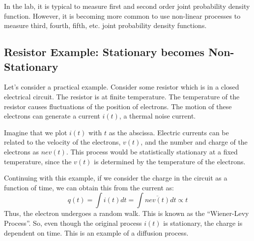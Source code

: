 \documentclass{article}
\begin{document}
In the lab, it is typical to measure first and second order joint probability
density function. However, it is becoming more common to use non-linear
processes to measure third, fourth, fifth, etc. joint probability density
functions.

\subsection{Resistor Example: Stationary becomes Non-Stationary}
Let's consider a practical example. Consider some resistor which is in a closed
electrical circuit. The resistor is at finite temperature. The temperature of
the resistor causes fluctuations of the position of electrons. The motion of
these electrons can generate a current $ i(t) $, a thermal noise current.

Imagine that we plot $ i(t) $ with $ t $ as the abscissa. Electric currents can
be related to the velocity of the electrons, $ v(t) $, and the number and charge of the
electrons as $ ne v(t) $. This process would be statistically stationary at a
fixed temperature, since the $ v(t) $ is determined by the temperature of the
electrons.

Continuing with this example, if we consider the charge in the circuit as a
function of time, we can obtain this from the current as:
\[
   q(t) = \int i(t) dt = \int \overline{n e v(t)} dt \propto t
\]
Thus, the electron undergoes a random walk. This is known as the ``Wiener-Levy
Process''. So, even though the original process $ i(t) $ is stationary, the
charge is dependent on time. This is an example of a diffusion process.
\end{document}

